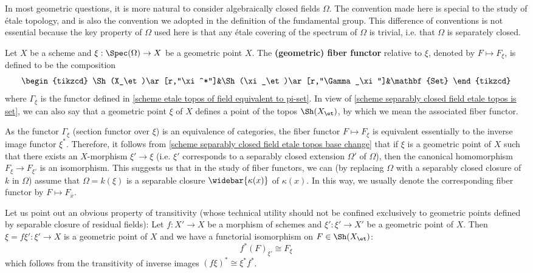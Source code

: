 \begin{remark}
In most geometric questions, it is more natural to consider algebraically closed fields $\Omega$. The convention made here is special to the study of \'etale topology, and is also the convention we adopted in the definition of the fundamental group. This difference of conventions is not essential because the key property of $\Omega$ used here is that any \'etale covering of the spectrum of $\Omega$ is trivial, i.e. that $\Omega$ is separately closed.
\end{remark}

\begin{definition}
Let $X$ be a scheme and $\xi:\Spec(\Omega)\to X$ be a geometric point $X$. The \textbf{(geometric) fiber functor} relative to $\xi$, denoted by $F\mapsto F_\xi$, is defined to be the composition
\[\begin{tikzcd}
\Sh(X_\et)\ar[r,"\xi^*"]&\Sh(\xi_\et)\ar[r,"\Gamma_\xi"]&\mathbf{Set}
\end{tikzcd}\]
where $\Gamma_\xi$ is the functor defined in \cref{scheme etale topos of field equivalent to pi-set}. In view of \cref{scheme separably closed field etale topos is set}, we can also say that a geometric point $\xi$ of $X$ defines a point of the topos $\Sh(X_\et)$, by which we mean the associated fiber functor.
\end{definition}

As the functor $\Gamma_\xi$ (section functor over $\xi$) is an equivalence of categories, the fiber functor $F\mapsto F_\xi$ is equivalent essentially to the inverse image functor $\xi^*$. Therefore, it follows from \cref{scheme separably closed field etale topos base change} that if $\xi$ is a geometric point of $X$ such that there exists an $X$-morphism $\xi'\to\xi$ (i.e. $\xi'$ corresponds to a separably closed extension $\Omega'$ of $\Omega$), then the canonical homomorphism $F_\xi\to F_{\xi'}$ is an isomorphism. This suggests us that in the study of fiber functors, we can (by replacing $\Omega$ with a separably closed closure of $k$ in $\Omega$) assume that $\Omega=k(\xi)$ is a separable closure $\widebar{\kappa(x)}$ of $\kappa(x)$. In this way, we usually denote the corresponding fiber functor by $F\mapsto F_{\bar{x}}$.\par
Let us point out an obvious property of transitivity (whose technical utility should not be confined exclusively to geometric points defined by separable closure of residual fields): Let $f:X'\to X$ be a morphism of schemes and $\xi':\xi'\to X'$ be a geometric point of $X$. Then $\xi=f\xi':\xi'\to X$ is a geometric point of $X$ and we have a functorial isomorphism on $F\in\Sh(X_\et)$:
\begin{equation}\label{scheme fiber functor transitivity}
f^*(F)_{\xi'}\cong F_\xi
\end{equation}
which follows from the transitivity of inverse images $(f\xi)^*\cong \xi^*f^*$.\par

